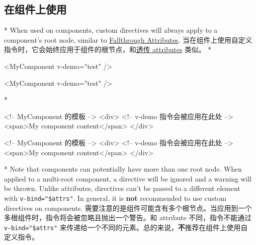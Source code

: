 \begin{paracol}{2}
\subsection{在组件上使用}
\switchcolumn[0]*%
When used on components, custom directives will always apply to a
component's root node, similar to
\href{https://vuejs.org/guide/components/attrs.html}{Fallthrough
Attributes}.
\switchcolumn
当在组件上使用自定义指令时，它会始终应用于组件的根节点，和\href{https://cn.vuejs.org/guide/components/attrs.html}{透传
attributes} 类似。
\switchcolumn[0]*%
\begin{codeHtml}
<MyComponent v-demo="test" />
\end{codeHtml}
\switchcolumn
\begin{codeHtml}
<MyComponent v-demo="test" />
\end{codeHtml}
\switchcolumn[0]*%
\begin{codeHtml}
<!-- MyComponent 的模板 -->
<div> <!-- v-demo 指令会被应用在此处 -->
  <span>My component content</span>
</div>
\end{codeHtml}
\switchcolumn
\begin{codeHtml}
<!-- MyComponent 的模板 -->
<div> <!-- v-demo 指令会被应用在此处 -->
  <span>My component content</span>
</div>
\end{codeHtml}
\switchcolumn[0]*%
Note that components can potentially have more than one root node. When
applied to a multi-root component, a directive will be ignored and a
warning will be thrown. Unlike attributes, directives can't be passed to
a different element with \texttt{v-bind="\$attrs"}. In general, it is
\textbf{not} recommended to use custom directives on components.
\switchcolumn
需要注意的是组件可能含有多个根节点。当应用到一个多根组件时，指令将会被忽略且抛出一个警告。和
attribute 不同，指令不能通过 \texttt{v-bind="\$attrs"}
来传递给一个不同的元素。总的来说，\textbf{不}推荐在组件上使用自定义指令。
\end{paracol}

